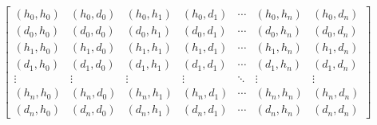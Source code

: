 \begin{equation}\label{markov:matrix-ordered}
\begin{bmatrix}
(h_0, h_0) & (h_0, d_0) &
(h_0, h_1) & (h_0, d_1) &
\cdots &
(h_0, h_n) & (h_0, d_n)\\

(d_0, h_0) & (d_0, d_0) &
(d_0, h_1) & (d_0, d_1) &
\cdots &
(d_0, h_n) & (d_0, d_n)\\


(h_1, h_0) & (h_1, d_0) &
(h_1, h_1) & (h_1, d_1) &
\cdots &
(h_1, h_n) & (h_1, d_n)\\

(d_1, h_0) & (d_1, d_0) &
(d_1, h_1) & (d_1, d_1) &
\cdots &
(d_1, h_n) & (d_1, d_n)\\


\vdots & \vdots & \vdots & \vdots & \ddots & \vdots & \vdots\\


(h_n, h_0) & (h_n, d_0) &
(h_n, h_1) & (h_n, d_1) &
\cdots &
(h_n, h_n) & (h_n, d_n)\\

(d_n, h_0) & (d_n, d_0) &
(d_n, h_1) & (d_n, d_1) &
\cdots &
(d_n, h_n) & (d_n, d_n)
\end{bmatrix}
\end{equation}
